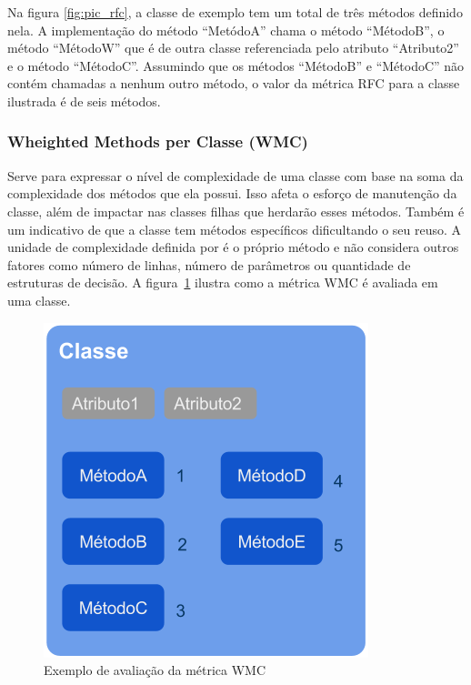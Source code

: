 \documentclass[conference]{IEEEtran}
\begin{document}
Na figura \ref{fig:pic_rfc}, a classe de exemplo tem um total de três métodos
definido nela. A implementação do método ``MetódoA'' chama o método ``MétodoB'',
o método ``MétodoW'' que é de outra classe referenciada pelo atributo
``Atributo2'' e o método ``MétodoC''. Assumindo que os métodos ``MétodoB'' e
``MétodoC'' não contém chamadas a nenhum outro método, o valor da métrica RFC
para a classe ilustrada é de seis métodos.

\subsubsection{\textbf{Wheighted Methods per Classe (WMC)}} Serve para expressar
o nível de complexidade de uma classe com base na soma da complexidade dos métodos que ela
possui. Isso afeta o esforço de manutenção da classe, além de impactar nas
classes filhas que herdarão esses métodos. Também é um indicativo de que a
classe tem métodos específicos dificultando o seu reuso. A unidade de
complexidade definida por \cite{cksuite} é o próprio método e não
considera outros fatores como número de linhas, número de parâmetros ou
quantidade de estruturas de decisão. A figura~\ref{fig:pic_wmc} ilustra como a
métrica WMC é avaliada em uma classe.

\begin{figure}[htb]
	\begin{center}
		\includegraphics[scale=0.6]{img/pic_wmc.png}
	\end{center}
	\caption{\label{fig:pic_wmc}Exemplo de avaliação da métrica WMC}
	
\end{figure}
\end{document}
